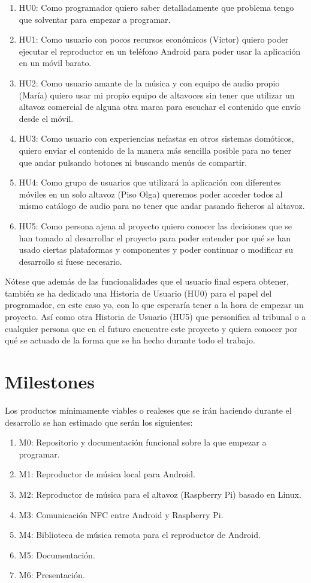 \begin{enumerate}
    \item HU0: Como programador quiero saber detalladamente que problema tengo que solventar para empezar a programar.
    \item HU1: Como usuario con pocos recursos económicos (Victor) quiero poder ejecutar el reproductor en un teléfono Android para poder usar la aplicación en un móvil barato.
    \item HU2: Como usuario amante de la música y con equipo de audio propio (María) quiero usar mi propio equipo de altavoces sin tener que utilizar un altavoz comercial de alguna otra marca para escuchar el contenido que envío desde el móvil.
    \item HU3: Como usuario con experiencias nefastas en otros sistemas domóticos, quiero enviar el contenido de la manera más sencilla posible para no tener que andar pulsando botones ni buscando menús de compartir.
    \item HU4: Como grupo de usuarios que utilizará la aplicación con diferentes móviles en un solo altavoz (Piso Olga) queremos poder acceder todos al mismo catálogo de audio para no tener que andar pasando ficheros al altavoz.
    \item HU5: Como persona ajena al proyecto quiero conocer las decisiones que se han tomado al desarrollar el proyecto para poder entender por qué se han usado ciertas plataformas y componentes y poder continuar o modificar su desarrollo si fuese necesario.
\end{enumerate}

Nótese que además de las funcionalidades que el usuario final espera obtener, también se ha dedicado una Historia de Usuario (HU0) para el papel del programador, en este caso yo, con lo que esperaría tener a la hora de empezar un proyecto.
Así como otra Historia de Usuario (HU5) que personifica al tribunal o a cualquier persona que en el futuro encuentre este proyecto y quiera conocer por qué se actuado de la forma que se ha hecho durante todo el trabajo.

\section{Milestones}
Los productos mínimamente viables o realeses que se irán haciendo durante el desarrollo se han estimado que serán los siguientes:

\begin{enumerate}
    \item M0: Repositorio y documentación funcional sobre la que empezar a programar.
    \item M1: Reproductor de música local para Android.
    \item M2: Reproductor de música para el altavoz (Raspberry Pi) basado en Linux.
    \item M3: Comunicación NFC entre Android y Raspberry Pi.
    \item M4: Biblioteca de música remota para el reproductor de Android.
    \item M5: Documentación.
    \item M6: Presentación.
\end{enumerate}